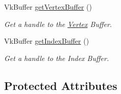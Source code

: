 \begin{DoxyCompactItemize}
Vk\+Buffer \mbox{\hyperlink{class_mesh_a2c18dc0f46962bfa01d274d632cd1242}{get\+Vertex\+Buffer}} ()
\begin{DoxyCompactList}\small\item\em Get a handle to the \mbox{\hyperlink{struct_vertex}{Vertex}} Buffer. \end{DoxyCompactList}\item 
Vk\+Buffer \mbox{\hyperlink{class_mesh_a7f8c80d74ef174adef3bc5b56aa715af}{get\+Index\+Buffer}} ()
\begin{DoxyCompactList}\small\item\em Get a handle to the Index Buffer. \end{DoxyCompactList}\end{DoxyCompactItemize}
\subsection*{Protected Attributes}
